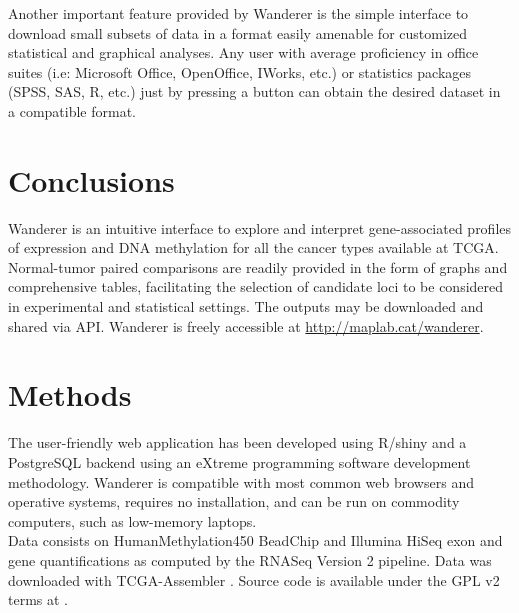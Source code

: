 \documentclass{bmcart}
\begin{document}
Another important feature provided by Wanderer is the simple interface to download small subsets of data in a format easily amenable for customized statistical and graphical analyses. Any user with average proficiency in office suites (i.e: Microsoft Office, OpenOffice, IWorks, etc.) or statistics packages (SPSS, SAS, R, etc.) just by pressing a button can obtain the desired dataset in a compatible format.\\

\section*{Conclusions}

Wanderer is an intuitive interface to explore and interpret gene-associated profiles of expression and DNA methylation for all the cancer types available at TCGA. Normal-tumor paired comparisons are readily provided in the form of graphs and comprehensive tables, facilitating the selection of candidate loci to be considered in experimental and statistical settings. The outputs may be downloaded and shared via API. Wanderer is freely accessible at \url{http://maplab.cat/wanderer}.\\



\section*{Methods}
The user-friendly web application has been developed using R/shiny and a PostgreSQL backend using an eXtreme programming software development methodology. Wanderer is compatible with most common web browsers and operative systems, requires no installation, and can be run on commodity computers, such as low-memory laptops.\\
 
Data consists on HumanMethylation450 BeadChip and Illumina HiSeq exon {\color{red} and gene} quantifications as computed by the RNASeq Version 2 pipeline. Data was downloaded with TCGA-Assembler \cite{zhu2014tcga}. Source code is available under the GPL v2 terms at \cite{sourceforge}.







\end{document}
